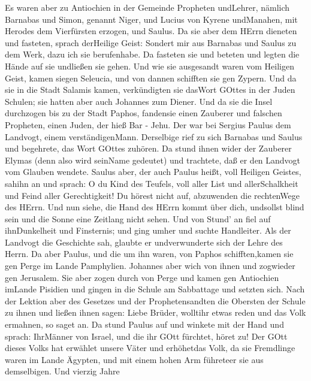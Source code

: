  Es waren aber zu Antiochien in der Gemeinde Propheten
undLehrer, nämlich Barnabas und Simon, genannt Niger, und Lucius von
Kyrene undManahen, mit Herodes dem Vierfürsten erzogen, und Saulus.
 Da sie aber dem HErrn dieneten und fasteten, sprach
derHeilige Geist: Sondert mir aus Barnabas und Saulus zu dem Werk, dazu
ich sie berufenhabe.  Da fasteten sie und beteten und legten
die Hände auf sie undließen sie gehen.  Und wie sie
ausgesandt waren vom Heiligen Geist, kamen siegen Seleucia, und von
dannen schifften sie gen Zypern.  Und da sie in die Stadt
Salamis kamen, verkündigten sie dasWort GOttes in der Juden Schulen; sie
hatten aber auch Johannes zum Diener.  Und da sie die Insel
durchzogen bis zu der Stadt Paphos, fandensie einen Zauberer und
falschen Propheten, einen Juden, der hieß Bar - Jehu.  Der
war bei Sergius Paulus dem Landvogt, einem verständigenMann. Derselbige
rief zu sich Barnabas und Saulus und begehrete, das Wort GOttes zuhören.
 Da stund ihnen wider der Zauberer Elymas (denn also wird
seinName gedeutet) und trachtete, daß er den Landvogt vom Glauben
wendete.  Saulus aber, der auch Paulus heißt, voll Heiligen
Geistes, sahihn an  und sprach: O du Kind des Teufels, voll
aller List und allerSchalkheit und Feind aller Gerechtigkeit! Du hörest
nicht auf, abzuwenden die rechtenWege des HErrn.  Und nun
siehe, die Hand des HErrn kommt über dich, undsollst blind sein und die
Sonne eine Zeitlang nicht sehen. Und von Stund' an fiel auf
ihnDunkelheit und Finsternis; und ging umher und suchte Handleiter.
 Als der Landvogt die Geschichte sah, glaubte er
undverwunderte sich der Lehre des Herrn.  Da aber Paulus,
und die um ihn waren, von Paphos schifften,kamen sie gen Perge im Lande
Pamphylien. Johannes aber wich von ihnen und zogwieder gen Jerusalem.
 Sie aber zogen durch von Perge und kamen gen Antiochien
imLande Pisidien und gingen in die Schule am Sabbattage und setzten
sich.  Nach der Lektion aber des Gesetzes und der
Prophetensandten die Obersten der Schule zu ihnen und ließen ihnen
sagen: Liebe Brüder, wolltihr etwas reden und das Volk ermahnen, so
saget an.  Da stund Paulus auf und winkete mit der Hand und
sprach: IhrMänner von Israel, und die ihr GOtt fürchtet, höret zu!
 Der GOtt dieses Volks hat erwählet unsere Väter und
erhöhetdas Volk, da sie Fremdlinge waren im Lande Ägypten, und mit einem
hohen Arm führeteer sie aus demselbigen.  Und vierzig Jahre
